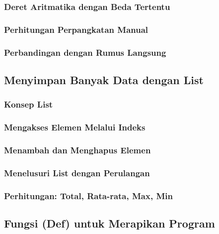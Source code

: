 \documentclass[12pt,a4paper]{article}
\begin{document}
\subsubsection{Deret Aritmatika dengan Beda Tertentu}

\subsubsection{Perhitungan Perpangkatan Manual}

\subsubsection{Perbandingan dengan Rumus Langsung}

\subsection{Menyimpan Banyak Data dengan List}

\subsubsection{Konsep List}

\subsubsection{Mengakses Elemen Melalui Indeks}

\subsubsection{Menambah dan Menghapus Elemen}

\subsubsection{Menelusuri List dengan Perulangan}

\subsubsection{Perhitungan: Total, Rata-rata, Max, Min}

\subsection{Fungsi (Def) untuk Merapikan Program}
\end{document}
